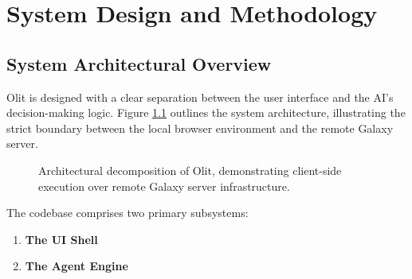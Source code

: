 \chapter{System Design and Methodology}
\label{chap:architecture}

\section{System Architectural Overview}
\label{sec:system_overview}

Olit is designed with a clear separation between the user interface and the AI's decision-making logic. Figure \ref{fig:arch_diagram} outlines the system architecture, illustrating the strict boundary between the local browser environment and the remote Galaxy server.

\begin{figure}[htbp]
\centering
{}
\caption{Architectural decomposition of Olit, demonstrating client-side execution over remote Galaxy server infrastructure.}
\label{fig:arch_diagram}
\end{figure}

The codebase comprises two primary subsystems:
\begin{enumerate}
    \item \textbf{The UI Shell} 
    \item \textbf{The Agent Engine}
\end{enumerate}

